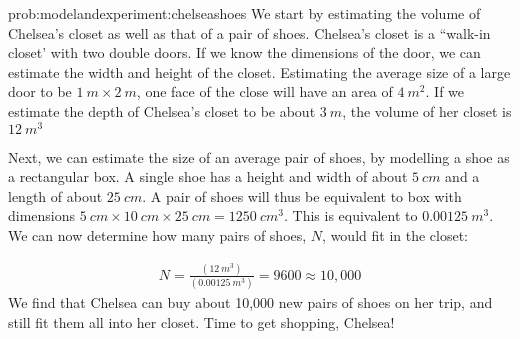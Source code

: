 \begin{solution}{prob:modelandexperiment:chelseashoes}\label{soln:modelandexperiment:chelseashoes}
We start by estimating the volume of Chelsea's closet as well as that of a pair of shoes. Chelsea's closet is a ``walk-in closet' with two double doors. If we know the dimensions of the door, we can estimate the width and height of the closet. Estimating the average size of a large door to be $\SI{1}{m}\times \SI{2}{m}$, one face of the close will have an area of $\SI{4}{m^2}$. If we estimate the depth of Chelsea's closet to be about $\SI{3}{m}$, the volume of her closet is $\SI{12}{m^3}$

Next, we can estimate the size of an average pair of shoes, by modelling a shoe as a rectangular box. A single shoe has a height and width of about $\SI{5}{cm}$ and a length of about $\SI{25}{cm}$. A pair of shoes will thus be equivalent to box with dimensions $\SI{5}{cm} \times \SI{10}{cm} \times \SI{25}{cm} = \SI{1250}{cm^3}$. This is equivalent to $\SI{0.00125}{m^3}$. We can now determine how many pairs of shoes, $N$, would fit in the closet:

\begin{align*}
N=\frac{(\SI{12}{m^3})}{(\SI{0.00125}{m^3})}= 9600\approx 10,000 
\end{align*}
We find that Chelsea can buy about 10,000 new pairs of shoes on her trip, and still fit them all into her closet. Time to get shopping, Chelsea!
\end{solution}
